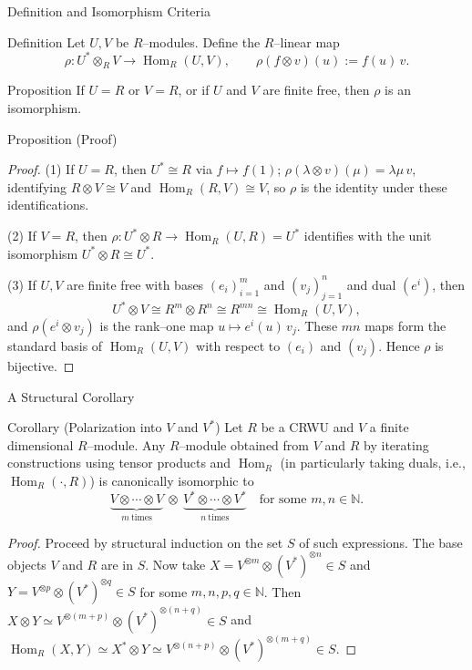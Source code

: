 \begin{frame}{Definition and Isomorphism Criteria}
\begin{block}{Definition}
Let $U,V$ be $R$–modules. Define the $R$–linear map
\[
\rho: U^*\otimes_R V \longrightarrow \operatorname{Hom}_R(U,V),\qquad
\rho(f\otimes v)(u):= f(u)\,v.
\]
\end{block}

\begin{block}{Proposition}
If $U=R$ or $V=R$, or if $U$ and $V$ are finite free, then $\rho$ is an isomorphism.
\end{block}
\end{frame}

\begin{frame}{Proposition (Proof)}

\begin{proof}
(1) If $U=R$, then $U^*\cong R$ via $f\mapsto f(1)$; $\rho(\lambda\otimes v)(\mu)=\lambda\mu\, v$, identifying $R\otimes V\cong V$ and $\operatorname{Hom}_R(R,V)\cong V$, so $\rho$ is the identity under these identifications.

(2) If $V=R$, then $\rho:U^*\otimes R\to \operatorname{Hom}_R(U,R)=U^*$ identifies with the unit isomorphism $U^*\otimes R\cong U^*$.

(3) If $U,V$ are finite free with bases $(e_i)_{i=1}^m$ and $(v_j)_{j=1}^n$ and dual $(e^i)$, then
\[
U^*\otimes V \cong R^{m}\otimes R^{n}\cong R^{mn}\cong \operatorname{Hom}_R(U,V),
\]
and $\rho(e^i\otimes v_j)$ is the rank–one map $u\mapsto e^i(u)\,v_j$. These $mn$ maps form the standard basis of $\operatorname{Hom}_R(U,V)$ with respect to $(e_i)$ and $(v_j)$. Hence $\rho$ is bijective.
\end{proof}
\end{frame}

\begin{frame}{A Structural Corollary}
\vspace{-0.3cm}
\begin{block}{Corollary (Polarization into $V$ and $V^*$)}
Let $R$ be a CRWU and $V$ a finite dimensional $R$–module.
Any $R$–module obtained from $V$ and $R$ by iterating constructions using
tensor products and $\operatorname{Hom}_R$
(in particularly taking duals, i.e., $\operatorname{Hom}_R(\cdot, R)$)
is canonically isomorphic to
\[
\underbrace{V\otimes\cdots\otimes V}_{m\ \text{times}}\ \otimes\
\underbrace{V^*\otimes\cdots\otimes V^*}_{n\ \text{times}}
\quad\text{for some }m,n\in\mathbb{N}.
\]
\end{block}
\vspace{-0.3cm}
\begin{proof}
Proceed by structural induction on the set $S$ of such expressions.
The base objects $V$ and $R$ are in $S$.
Now take
$X = V^{\otimes m} \otimes (V^*)^{\otimes n} \in S$ and
$Y = V^{\otimes p} \otimes (V^*)^{\otimes q} \in S$
for some $m, n, p, q \in \mathbb{N}$.
Then
$X \otimes Y \simeq V^{\otimes (m + p)} \otimes (V^*)^{\otimes (n + q)} \in S$
and
$\operatorname{Hom}_R(X, Y) \simeq X^* \otimes Y
\simeq V^{\otimes (n + p)} \otimes (V^*)^{\otimes (m + q)} \in S$.
\end{proof}
\end{frame}

